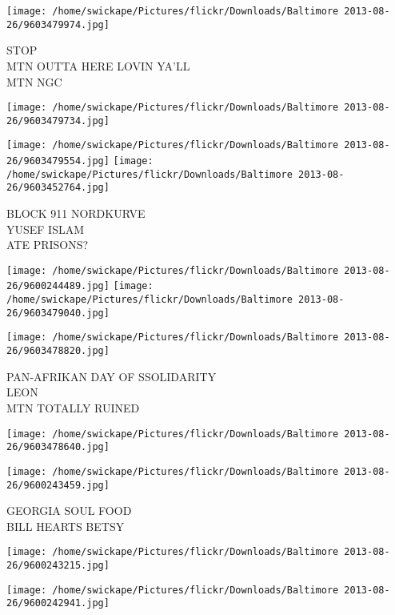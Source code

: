 \documentclass[10pt,letterpaper]{article}
\begin{document}
\texttt{[image: /home/swickape/Pictures/flickr/Downloads/Baltimore 2013-08-26/9603479974.jpg]}

STOP\\
MTN OUTTA HERE LOVIN YA'LL\\
MTN NGC\\
\pagebreak

\texttt{[image: /home/swickape/Pictures/flickr/Downloads/Baltimore 2013-08-26/9603479734.jpg]}

\vspace{0.25in}
\texttt{[image: /home/swickape/Pictures/flickr/Downloads/Baltimore 2013-08-26/9603479554.jpg]}
\texttt{[image: /home/swickape/Pictures/flickr/Downloads/Baltimore 2013-08-26/9603452764.jpg]}

BLOCK 911 NORDKURVE\\
YUSEF ISLAM\\
ATE PRISONS?\\
\pagebreak

\texttt{[image: /home/swickape/Pictures/flickr/Downloads/Baltimore 2013-08-26/9600244489.jpg]}
\texttt{[image: /home/swickape/Pictures/flickr/Downloads/Baltimore 2013-08-26/9603479040.jpg]}

\texttt{[image: /home/swickape/Pictures/flickr/Downloads/Baltimore 2013-08-26/9603478820.jpg]}

PAN{-}AFRIKAN DAY OF SSOLIDARITY\\
LEON\\
MTN TOTALLY RUINED\\
\pagebreak

\texttt{[image: /home/swickape/Pictures/flickr/Downloads/Baltimore 2013-08-26/9603478640.jpg]}

\vspace{0.25in}
\texttt{[image: /home/swickape/Pictures/flickr/Downloads/Baltimore 2013-08-26/9600243459.jpg]}

GEORGIA SOUL FOOD\\
BILL HEARTS BETSY\\
\pagebreak

\texttt{[image: /home/swickape/Pictures/flickr/Downloads/Baltimore 2013-08-26/9600243215.jpg]}

\vspace{0.25in}
\texttt{[image: /home/swickape/Pictures/flickr/Downloads/Baltimore 2013-08-26/9600242941.jpg]}
\end{document}
